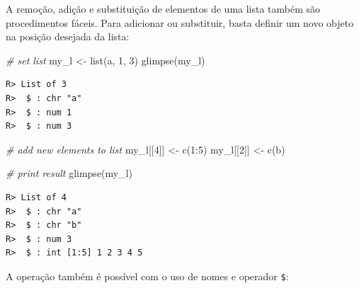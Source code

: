 \documentclass[
  11pt,
]{book}
\newenvironment{Shaded}{\begin{snugshade}}{\end{snugshade}}
\newcommand{\AttributeTok}[1]{\textcolor[rgb]{0.61,0.61,0.61}{#1}}
\newcommand{\CommentTok}[1]{\textcolor[rgb]{0.37,0.37,0.37}{\textit{#1}}}
\newcommand{\DecValTok}[1]{\textcolor[rgb]{0.06,0.06,0.06}{#1}}
\newcommand{\FunctionTok}[1]{\textcolor[rgb]{0,0,0}{#1}}
\newcommand{\NormalTok}[1]{#1}
\newcommand{\OtherTok}[1]{\textcolor[rgb]{0.37,0.37,0.37}{#1}}
\newcommand{\SpecialCharTok}[1]{\textcolor[rgb]{0,0,0}{#1}}
\newcommand{\StringTok}[1]{\textcolor[rgb]{0.5,0.5,0.5}{#1}}
\begin{document}
A remoção, adição e substituição de elementos de uma lista também são procedimentos fáceis. Para adicionar ou substituir, basta definir um novo objeto na posição desejada da lista:

\begin{Shaded}
\begin{Highlighting}[]
\CommentTok{\# set list}
\NormalTok{my\_l }\OtherTok{\textless{}{-}} \FunctionTok{list}\NormalTok{(}\StringTok{\textquotesingle{}a\textquotesingle{}}\NormalTok{, }\DecValTok{1}\NormalTok{, }\DecValTok{3}\NormalTok{)}
\FunctionTok{glimpse}\NormalTok{(my\_l)}
\end{Highlighting}
\end{Shaded}

\begin{verbatim}
R> List of 3
R>  $ : chr "a"
R>  $ : num 1
R>  $ : num 3
\end{verbatim}

\begin{Shaded}
\begin{Highlighting}[]
\CommentTok{\# add new elements to list}
\NormalTok{my\_l[[}\DecValTok{4}\NormalTok{]] }\OtherTok{\textless{}{-}} \FunctionTok{c}\NormalTok{(}\DecValTok{1}\SpecialCharTok{:}\DecValTok{5}\NormalTok{)}
\NormalTok{my\_l[[}\DecValTok{2}\NormalTok{]] }\OtherTok{\textless{}{-}} \FunctionTok{c}\NormalTok{(}\StringTok{\textquotesingle{}b\textquotesingle{}}\NormalTok{)}

\CommentTok{\# print result}
\FunctionTok{glimpse}\NormalTok{(my\_l)}
\end{Highlighting}
\end{Shaded}

\begin{verbatim}
R> List of 4
R>  $ : chr "a"
R>  $ : chr "b"
R>  $ : num 3
R>  $ : int [1:5] 1 2 3 4 5
\end{verbatim}

A operação também é possível com o uso de nomes e operador \texttt{\$}:

\begin{Shaded}
\end{Shaded}
\end{document}
